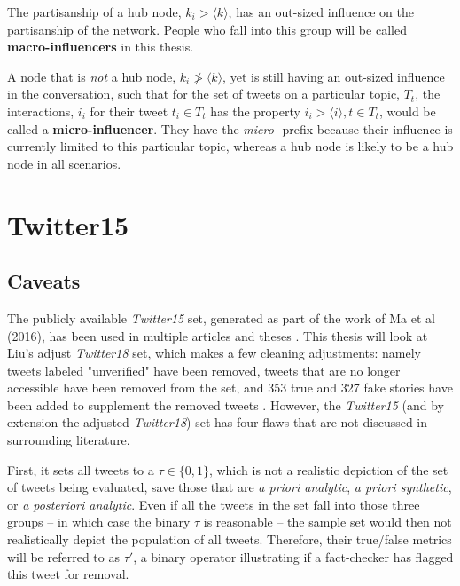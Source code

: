 \documentclass[preprint,review,12pt]{elsarticle}
\begin{document}
 The partisanship of a hub node, $k_i > \langle k \rangle$, has an out-sized influence on the partisanship of the network. People who fall into this group will be called \textbf{macro-influencers} in this thesis.
 
 A node that is \textit{not} a hub node, $k_i \ngtr \langle k \rangle$, yet is still having an out-sized influence in the conversation, such that for the set of tweets on a particular topic, $T_t$, the interactions, $i_i$ for their tweet $t_i \in T_t$ has the property $i_i > \langle i \rangle, t \in T_t$, would be called a \textbf{micro-influencer}. They have the \textit{micro-} prefix because their influence is currently limited to this particular topic, whereas a hub node is likely to be a hub node in all scenarios.

\section{Twitter15}
 \subsection{Caveats}
 The publicly available \textit{Twitter15} set, generated as part of the work of Ma et al (2016), has been used in multiple articles and theses \citep{liu2018early,ma2017detect,ma2016detecting,khoo2020interpretable,liu2019early,huang2019deep}. This thesis will look at Liu's adjust \textit{Twitter18} set, which makes a few cleaning adjustments: namely tweets labeled "unverified" have been removed, tweets that are no longer accessible have been removed from the set, and 353 true and 327 fake stories have been added to supplement the removed tweets \citep{liu2019early}. However, the \textit{Twitter15} (and by extension the adjusted \textit{Twitter18}) set has four flaws that are not discussed in surrounding literature. 
 
First, it sets all tweets to a $\tau \in \{0,1\}$, which is not a realistic depiction of the set of tweets being evaluated, save those that are \textit{a priori analytic}, \textit{a priori synthetic}, or \textit{a posteriori analytic}. Even if all the tweets in the set fall into those three groups -- in which case the binary $\tau$ is reasonable -- the sample set would then not realistically depict the population of all tweets. Therefore, their true/false metrics will be referred to as $\tau'$, a binary operator illustrating if a fact-checker has flagged this tweet for removal.
\end{document}
